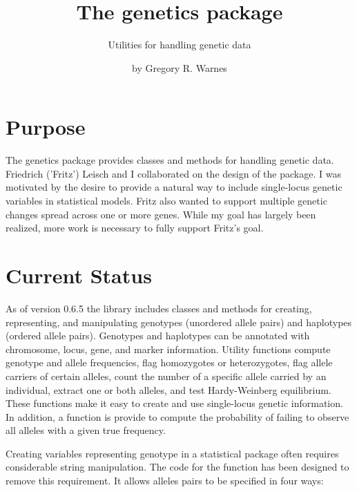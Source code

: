 \documentclass{report}
\begin{document}
\author{by Gregory R. Warnes}
\title{The genetics package}
\subtitle{Utilities for handling genetic data}

\maketitle

\section{Purpose}

The genetics package provides classes and methods for handling genetic
data.  Friedrich ('Fritz') Leisch and I collaborated on the design of
the package.  I was motivated by the desire to provide a natural way
to include single-locus genetic variables in statistical models.
Fritz also wanted to support multiple genetic changes spread across
one or more genes.  While my goal has largely been realized, more work
is necessary to fully support Fritz's goal.

\section{Current Status}

As of version 0.6.5 the library includes classes and methods for
creating, representing, and manipulating genotypes (unordered allele
pairs) and haplotypes (ordered allele pairs).  Genotypes and
haplotypes can be annotated with chromosome, locus, gene, and marker
information. Utility functions compute genotype and allele
frequencies, flag homozygotes or heterozygotes, flag allele carriers
of certain alleles, count the number of a specific allele carried by
an individual, extract one or both alleles, and test Hardy-Weinberg
equilibrium.  These functions make it easy to create and use
single-locus genetic information. In addition, a function is provide
to compute the probability of failing to observe all alleles with a
given true frequency.

Creating variables representing genotype in a statistical package
often requires considerable string manipulation.  The code for the
 function has been designed to remove this requirement.
It allows alleles pairs to be specified in four ways:
\end{document}
